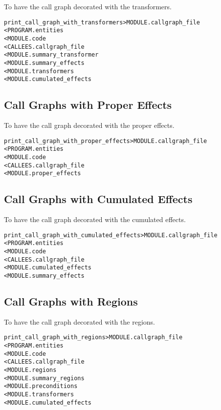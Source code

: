 \documentclass[a4paper]{report}
\newenvironment{PipsMake}{\begin{alltt}}{\end{alltt}}
\begin{document}
To have the call graph decorated with the transformers.
\begin{PipsMake}
print_call_graph_with_transformers       > MODULE.callgraph_file
        < PROGRAM.entities
        < MODULE.code
        < CALLEES.callgraph_file
        < MODULE.summary_transformer
        < MODULE.summary_effects
        < MODULE.transformers
        < MODULE.cumulated_effects
\end{PipsMake}

\subsection{Call Graphs with Proper Effects}

To have the call graph decorated with the proper effects.
\begin{PipsMake}
print_call_graph_with_proper_effects     > MODULE.callgraph_file
        < PROGRAM.entities
        < MODULE.code
        < CALLEES.callgraph_file
        < MODULE.proper_effects
\end{PipsMake}

\subsection{Call Graphs with Cumulated Effects}

To have the call graph decorated with the cumulated effects.
\begin{PipsMake}
print_call_graph_with_cumulated_effects  > MODULE.callgraph_file
        < PROGRAM.entities
        < MODULE.code
        < CALLEES.callgraph_file
        < MODULE.cumulated_effects
        < MODULE.summary_effects
\end{PipsMake}

\subsection{Call Graphs with Regions}

To have the call graph decorated with the regions.
\begin{PipsMake}
print_call_graph_with_regions            > MODULE.callgraph_file
        < PROGRAM.entities
        < MODULE.code
        < CALLEES.callgraph_file
        < MODULE.regions
        < MODULE.summary_regions
        < MODULE.preconditions
        < MODULE.transformers
        < MODULE.cumulated_effects
\end{PipsMake}
\end{document}
